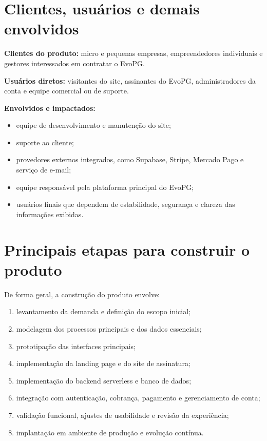 \documentclass[
  12pt,
  openany,
  oneside,
  a4paper,
  brazil
]{abntex2}
\begin{document}
\section{Clientes, usu\'arios e demais envolvidos}
\textbf{Clientes do produto:} micro e pequenas empresas, empreendedores individuais e gestores interessados em contratar o EvoPG.

\textbf{Usu\'arios diretos:} visitantes do site, assinantes do EvoPG, administradores da conta e equipe comercial ou de suporte.

\textbf{Envolvidos e impactados:}
\begin{itemize}
  \item equipe de desenvolvimento e manuten\c{c}\~ao do site;
  \item suporte ao cliente;
  \item provedores externos integrados, como Supabase, Stripe, Mercado Pago e servi\c{c}o de e-mail;
  \item equipe respons\'avel pela plataforma principal do EvoPG;
  \item usu\'arios finais que dependem de estabilidade, seguran\c{c}a e clareza das informa\c{c}\~oes exibidas.
\end{itemize}

\section{Principais etapas para construir o produto}
De forma geral, a constru\c{c}\~ao do produto envolve:
\begin{enumerate}
  \item levantamento da demanda e defini\c{c}\~ao do escopo inicial;
  \item modelagem dos processos principais e dos dados essenciais;
  \item prototipa\c{c}\~ao das interfaces principais;
  \item implementa\c{c}\~ao da landing page e do site de assinatura;
  \item implementa\c{c}\~ao do backend serverless e banco de dados;
  \item integra\c{c}\~ao com autentica\c{c}\~ao, cobran\c{c}a, pagamento e gerenciamento de conta;
  \item valida\c{c}\~ao funcional, ajustes de usabilidade e revis\~ao da experi\^encia;
  \item implanta\c{c}\~ao em ambiente de produ\c{c}\~ao e evolu\c{c}\~ao cont\'inua.
\end{enumerate}
\end{document}
